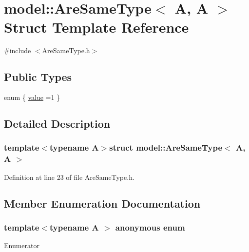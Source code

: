 \hypertarget{structmodel_1_1_are_same_type_3_01_a_00_01_a_01_4}{}\section{model\+:\+:Are\+Same\+Type$<$ A, A $>$ Struct Template Reference}
\label{structmodel_1_1_are_same_type_3_01_a_00_01_a_01_4}


{\ttfamily \#include $<$Are\+Same\+Type.\+h$>$}

\subsection*{Public Types}
\begin{DoxyCompactItemize}
\item 
enum \{ \hyperlink{structmodel_1_1_are_same_type_3_01_a_00_01_a_01_4_afee9d942ce340eb799cbbb69f240ef6da693258c151c8a19086fc4fec2f1820f6}{value} =1
 \}
\end{DoxyCompactItemize}


\subsection{Detailed Description}
\subsubsection*{template$<$typename A$>$struct model\+::\+Are\+Same\+Type$<$ A, A $>$}



Definition at line 23 of file Are\+Same\+Type.\+h.



\subsection{Member Enumeration Documentation}
\hypertarget{structmodel_1_1_are_same_type_3_01_a_00_01_a_01_4_afee9d942ce340eb799cbbb69f240ef6d}{}\subsubsection[{anonymous enum}]{\setlength{\rightskip}{0pt plus 5cm}template$<$typename A $>$ anonymous enum}\label{structmodel_1_1_are_same_type_3_01_a_00_01_a_01_4_afee9d942ce340eb799cbbb69f240ef6d}
\begin{Desc}
\item[Enumerator]\par
\begin{description}
\item[{\em 
\hypertarget{structmodel_1_1_are_same_type_3_01_a_00_01_a_01_4_afee9d942ce340eb799cbbb69f240ef6da693258c151c8a19086fc4fec2f1820f6}{}value\label{structmodel_1_1_are_same_type_3_01_a_00_01_a_01_4_afee9d942ce340eb799cbbb69f240ef6da693258c151c8a19086fc4fec2f1820f6}
}]\end{description}
\end{Desc}


